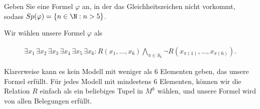 
\begin{exercise}[70]

Geben Sie eine Formel $\varphi$ an, in der das Gleichheitszeichen nicht vorkommt,
sodass $Sp(\varphi) = \{n \in \N: n > 5\}$.

\end{exercise}


\begin{solution}

Wir wählen unsere Formel $\varphi$ als

\begin{align*}
  \exists x_1\, \exists x_2\, \exists x_3\, \exists x_4\, \exists x_5\, \exists x_6:
  R(x_1,\dots,x_6) \bigwedge_{\pi \in S_6} \neg R(x_{\pi(1)},\dots,x_{\pi(6)}).
\end{align*}

Klarerweise kann es kein Modell mit weniger als $6$ Elementen geben, das unsere
Formel erfüllt. Für jedes Modell mit mindestens $6$ Elementen, können wir
die Relation $R$ einfach als ein beliebiges Tupel in $M^k$ wählen, und
unsere Formel wird von allen Belegungen erfüllt.

\end{solution}

